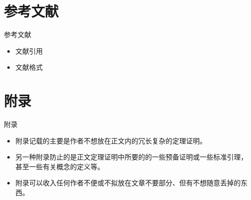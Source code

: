 \documentclass[13pt]{ctexbeamer}
\begin{document}
\section{参考文献}
\begin{frame}{参考文献}
	
	\begin{itemize}
		\item  文献引用
		\item  文献格式
	\end{itemize}
\end{frame}

\section{附录}
\begin{frame}{附录}
	
	\begin{itemize}
		\item  附录记载的主要是作者不想放在正文内的冗长复杂的定理证明。
		\item  另一种附录防止的是正文定理证明中所要的的一些预备证明或一些标准引理，甚至一些有关概念的定义等。
		\item 附录可以收入任何作者不便或不拟放在文章不要部分、但有不想随意丢掉的东西。
	\end{itemize}
\end{frame}
\end{document}
